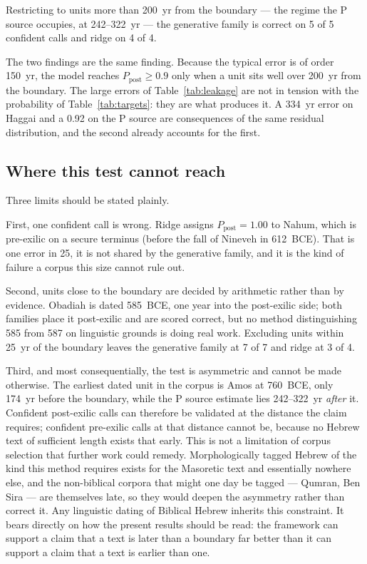 \documentclass[10pt,letterpaper]{article}
\begin{document}
Restricting to units more than 200~yr from the boundary --- the regime the
P source occupies, at 242--322~yr --- the generative family is correct on 5
of 5 confident calls and ridge on 4 of 4.

The two findings are the same finding.  Because the typical error is of
order 150~yr, the model reaches $P_{\text{post}} \geq 0.9$ only when a unit
sits well over 200~yr from the boundary.  The large errors of
Table~\ref{tab:leakage} are not in tension with the probability of
Table~\ref{tab:targets}: they are what produces it.  A 334~yr error on
Haggai and a 0.92 on the P source are consequences of the same residual
distribution, and the second already accounts for the first.

\subsection*{Where this test cannot reach}

Three limits should be stated plainly.

First, one confident call is wrong.  Ridge assigns $P_{\text{post}} = 1.00$
to Nahum, which is pre-exilic on a secure terminus (before the fall of
Nineveh in 612~BCE).  That is one error in 25, it is not shared by the
generative family, and it is the kind of failure a corpus this size cannot
rule out.

Second, units close to the boundary are decided by arithmetic rather than by
evidence.  Obadiah is dated 585~BCE, one year into the post-exilic side; both
families place it post-exilic and are scored correct, but no method
distinguishing 585 from 587 on linguistic grounds is doing real work.
Excluding units within 25~yr of the boundary leaves the generative family at
7 of 7 and ridge at 3 of 4.

Third, and most consequentially, the test is asymmetric and cannot be made
otherwise.  The earliest dated unit in the corpus is Amos at 760~BCE, only
174~yr before the boundary, while the P source estimate lies 242--322~yr
\emph{after} it.  Confident post-exilic calls can therefore be validated at
the distance the claim requires; confident pre-exilic calls at that distance
cannot be, because no Hebrew text of sufficient length exists that early.
This is not a limitation of corpus selection that further work could
remedy.  Morphologically tagged Hebrew of the kind this method requires
exists for the Masoretic text and essentially nowhere else, and the
non-biblical corpora that might one day be tagged --- Qumran, Ben Sira ---
are themselves late, so they would deepen the asymmetry rather than correct
it.  Any linguistic dating of Biblical Hebrew inherits this constraint.  It
bears directly on how the present results should be read: the framework can
support a claim that a text is later than a boundary far better than it can
support a claim that a text is earlier than one.
\end{document}
